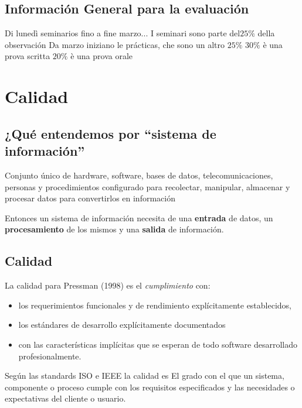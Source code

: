 \section*{Información General para la evaluación}
Di lunedì seminarios fino a fine marzo...
I seminari sono parte del$ 25\%$ della observación
Da marzo iniziano le prácticas, che sono un altro $25\%$
$30\%$ è una prova scritta
$20\%$ è una prova orale 

\chapter{Calidad}

\section{¿Qué entendemos por ``sistema de información''}

\begin{definition}
   Conjunto único de hardware, software, bases de datos,
   telecomunicaciones, personas y procedimientos configurado
   para recolectar, manipular, almacenar y procesar datos para
   convertirlos en información
\end{definition}

Entonces un sistema de información necesita de una \textbf{entrada} de datos, un \textbf{procesamiento} de los mismos y una \textbf{salida} de información.

\section{Calidad}
\begin{definition}[Calidad - 1] 
   La calidad para Pressman (1998) es el \textit{cumplimiento} con:
   \begin{itemize}
      \item los requerimientos funcionales y de rendimiento explícitamente establecidos,
      \item los estándares de desarrollo explícitamente documentados
      \item con las características implícitas que se esperan de todo
      software desarrollado profesionalmente.
   \end{itemize}
\end{definition}

\begin{definition}[Calidad - 2]
   Según las standards ISO e IEEE la calidad es
   El grado con el que un sistema, componente o proceso
   cumple con los requisitos especificados y las necesidades o
   expectativas del cliente o usuario.
\end{definition}

